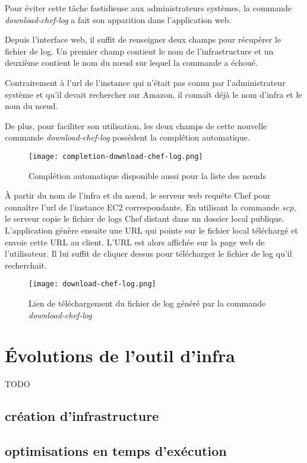 Pour éviter cette tâche fastidieuse aux administrateurs systèmes, la commande
\textit{download-chef-log} a fait son apparition dans l'application web.

Depuis l'interface web, il suffit de renseigner deux champs pour récupérer le
fichier de log. Un premier champ contient le nom de l'infrastructure et un
deuxième contient le nom du nœud sur lequel la commande a échoué.

Contrairement à l'url de l'instance qui n'était pas connu par l'administrateur
système et qu'il devait rechercher sur Amazon, il connaît déjà le nom d'infra et
le nom du nœud.

De plus, pour faciliter son utilisation, les deux champs de cette nouvelle
commande \textit{download-chef-log} possèdent la complétion automatique.

\begin{figure}[H]
  \texttt{[image: completion-download-chef-log.png]}
  \caption{Complétion automatique disponible aussi pour la liste des nœuds}
\end{figure}

À partir du nom de l'infra et du nœud, le serveur web requête Chef pour
connaître l'url de l'instance EC2 correspondante. En utilisant la commande
\textit{scp}, le serveur copie le fichier de logs Chef distant dans un
dossier local publique.
L'application génère ensuite une URL qui pointe sur le fichier local téléchargé
et envoie cette URL au client.
L'URL est alors affichée sur la page web de l'utilisateur. Il lui suffit de
cliquer dessus pour télécharger le fichier de log qu'il recherchait.


\begin{figure}[H]
  \texttt{[image: download-chef-log.png]}
  \caption{Lien de téléchargement du fichier de log généré par la commande \textit{download-chef-log}}
\end{figure}

\section{Évolutions de l'outil d'infra}
TODO
\subsection{création d'infrastructure}
\subsection{optimisations en temps d'exécution}
